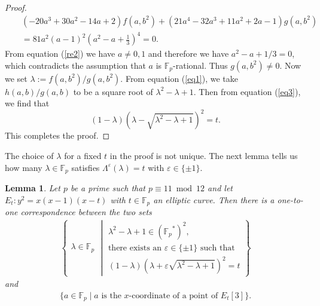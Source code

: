 \documentclass[a4paper, 11pt]{article}
\theoremstyle{plain}
\newtheorem{lem}[defn]{Lemma}
\newcommand{\?}{\textcolor{red}{??}}
\newcommand{\lm}{\lambda}
\newcommand{\Lm}{\Lambda}
\newcommand{\fp}{\mathbb{F}_p}
\begin{document}
\begin{proof}
    \begin{eqnarray*}
      && (-20a^3+
    30a^2- 14a+2)f(a,b^2)+( 21a^4- 32a^3+ 11a^2 +
    2a-1)g(a,b^2)\\
    &&=81a^2(a-1)^2\left(a^2 - a + \frac{1}{3} \right)^4=0.
    \end{eqnarray*}
    From equation (\ref{re2}) we have $a \ne 0,1$ and therefore we have $a^2 - a + 1/3=0$, which contradicts the assumption that $a$ is $\fp$-rational. Thus $g(a,b^2)\ne 0$.
    Now we set $\lm:=f(a,b^2)/g(a,b^2)$. From equation (\ref{eq1}),
    we take $h(a,b)/g(a,b)$ to be a square root of ${\lm^2-\lm+1}$.  Then from equation (\ref{eq3}), we find that
    \[
    (1-\lm)(\lm-\sqrt{\lm^2-\lm+1})^2=t.
    \]
    This completes the proof.
\end{proof}
The choice of $\lm$ for a fixed $t$ in the proof is not unique. The next lemma tells us how many $\lm \in \fp$ satisfies $\Lm^{\varepsilon}(\lm)=t$ with $\varepsilon\in\{\pm1\}$.
\begin{lem}
\label{howmanylambda}
Let $p$ be a prime such that $p \equiv 11 \bmod 12$ and
let $E_t:y^2=x(x-1)(x-t)$ with $t \in \fp$ an elliptic curve. Then there is a one-to-one correspondence between the two sets
\begin{align*}
\left\{
 \begin{array}{cc}
       \lm \in \fp
 \end{array}
\middle|  
 \begin{array}{ccc}
       {\lm}^2-\lm+1 \in \left({\fp}^{*}\right)^2 ,\\
       \textrm{there exists an }\varepsilon\in \{\pm1\} \textrm{ such that }\\
      (1-\lm)(\lm+\varepsilon\sqrt{\lm^2-\lm+1})^2=t
 \end{array}
\right\}
\end{align*}
and 
\begin{align*}
    \{a \in \fp \mid  a \textrm{ is the } x\textrm{-coordinate of a point of } E_{t}[3]\}.
\end{align*}

\end{lem}
\end{document}
